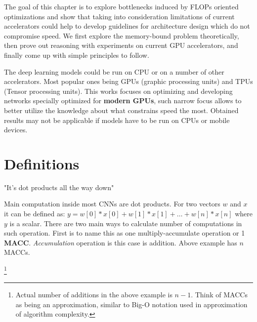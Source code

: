 The goal of this chapter is to explore bottlenecks induced by FLOPs oriented optimizations and show that taking into consideration limitations of current accelerators could help to develop guidelines for architecture design which do not compromise speed. We first explore the memory-bound problem theoretically, then prove out reasoning with experiments on current GPU accelerators, and finally come up with simple principles to follow. 

The deep learning models could be run on CPU or on a number of other accelerators. Most popular ones being GPUs (graphic processing units) and TPUs (Tensor processing units). 
This works focuses on optimizing and developing networks specially optimized for \textbf{modern GPUs}, such narrow focus allows to better utilize the knowledge about what constrains speed the most. Obtained results may not be applicable if models have to be run on CPUs or mobile devices. %




\section{Definitions}

"It’s dot products all the way down" 

Main computation inside most CNNs are dot products. For two vectors $w$ and $x$ it can be defined as: $y = w[0]*x[0] + w[1]*x[1] + \ldots + w[n] * x[n]$ where $y$ is a scalar.
There are two main ways to calculate number of computations in such operation. First is to name this as one multiply-accumulate operation or 1 \textbf{MACC}. \textit{Accumulation} operation is this case is addition. Above example has $n$ MACCs. 


\footnote{Actual number of additions in the above example is $n - 1$. Think of MACCs as being an approximation, similar to Big-O notation used in approximation of algorithm complexity.}



